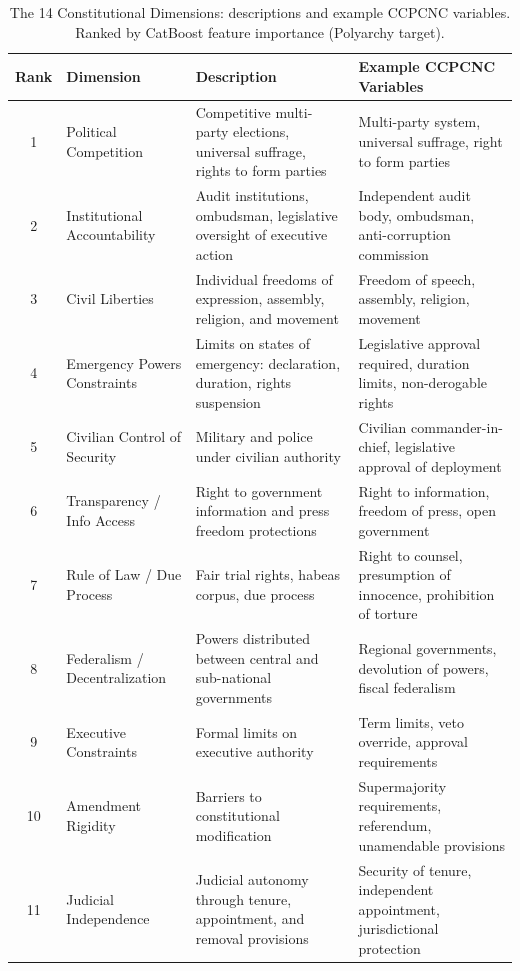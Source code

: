 \documentclass[9pt,twoside]{pnas-new}
\begin{document}
\begin{table}[t!]
\centering
\fontsize{5pt}{6pt}\selectfont
\setlength{\tabcolsep}{4pt}
\renewcommand{\arraystretch}{0.82}
\caption{The 14 Constitutional Dimensions: descriptions and example CCPCNC variables. Ranked by CatBoost feature importance (Polyarchy target).}
\label{tab:dimensions}
\begin{tabular}{clp{3.8cm}p{3.8cm}}
\textbf{Rank} & \textbf{Dimension} & \textbf{Description} & \textbf{Example CCPCNC Variables} \\
\midrule
1  & Political Competition         & Competitive multi-party elections, universal suffrage, rights to form parties & Multi-party system, universal suffrage, right to form parties \\
2  & Institutional Accountability  & Audit institutions, ombudsman, legislative oversight of executive action & Independent audit body, ombudsman, anti-corruption commission \\
3  & Civil Liberties               & Individual freedoms of expression, assembly, religion, and movement & Freedom of speech, assembly, religion, movement \\
4  & Emergency Powers Constraints  & Limits on states of emergency: declaration, duration, rights suspension & Legislative approval required, duration limits, non-derogable rights \\
5  & Civilian Control of Security  & Military and police under civilian authority & Civilian commander-in-chief, legislative approval of deployment \\
6  & Transparency / Info Access    & Right to government information and press freedom protections & Right to information, freedom of press, open government \\
7  & Rule of Law / Due Process     & Fair trial rights, habeas corpus, due process & Right to counsel, presumption of innocence, prohibition of torture \\
8  & Federalism / Decentralization & Powers distributed between central and sub-national governments & Regional governments, devolution of powers, fiscal federalism \\
9  & Executive Constraints         & Formal limits on executive authority & Term limits, veto override, approval requirements \\
10 & Amendment Rigidity            & Barriers to constitutional modification & Supermajority requirements, referendum, unamendable provisions \\
11 & Judicial Independence         & Judicial autonomy through tenure, appointment, and removal provisions & Security of tenure, independent appointment, jurisdictional protection \\

\end{tabular}
\end{table}
\end{document}

